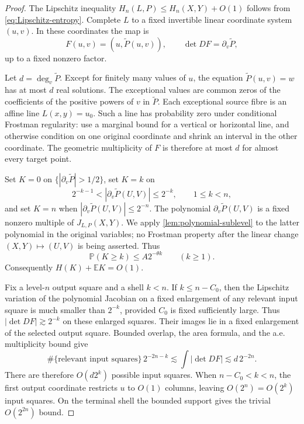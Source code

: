 \documentclass[11pt]{article}
\begin{document}
\begin{proof}
The Lipschitz inequality
\(H_n(L,P)\le H_n(X,Y)+O(1)\) follows from
\eqref{eq:Lipschitz-entropy}.  Complete \(L\) to a fixed invertible
linear coordinate system \((u,v)\).  In these coordinates the map is
\[
 F(u,v)=(u,\widetilde P(u,v)),
 \qquad \det DF=\partial_v\widetilde P,
\]
up to a fixed nonzero factor.

Let \(d=\deg_v\widetilde P\).  Except for finitely many values of
\(u\), the equation \(\widetilde P(u,v)=w\) has at most \(d\) real
solutions.  The exceptional values are common zeros of the
coefficients of the positive powers of \(v\) in \(\widetilde P\).
Each exceptional
source fibre is an affine line \(L(x,y)=u_0\).  Such a line has
probability zero under conditional Frostman regularity: use a
marginal bound for a vertical or horizontal line, and otherwise
condition on one original coordinate and shrink an interval in the
other coordinate.  The geometric
multiplicity of \(F\) is therefore at most \(d\) for almost every
target point.

Set \(K=0\) on \(\{|\partial_v\widetilde P|>1/2\}\), set \(K=k\)
on
\[
 2^{-k-1}<|\partial_v\widetilde P(U,V)|\le2^{-k},
 \qquad 1\le k<n,
\]
and set \(K=n\) when
\(|\partial_v\widetilde P(U,V)|\le2^{-n}\).  The polynomial
\(\partial_v\widetilde P(U,V)\) is a fixed nonzero multiple of
\(J_{L,P}(X,Y)\).  We apply \cref{lem:polynomial-sublevel} to the
latter polynomial in the original variables; no Frostman property
after the linear change \((X,Y)\mapsto(U,V)\) is being asserted.
Thus
\begin{equation}
 \mathbb P(K\ge k)\le A2^{-\theta k}\qquad(k\ge1).
 \label{eq:Jacobian-shell-tail}
\end{equation}
Consequently \(H(K)+\mathbb E K=O(1)\).

Fix a level-\(n\) output square and a shell \(k<n\).  If
\(k\le n-C_0\), then the Lipschitz variation of the polynomial
Jacobian on a fixed enlargement of any relevant input square is much
smaller than \(2^{-k}\), provided \(C_0\) is fixed sufficiently
large.  Thus \(|\det DF|\gtrsim2^{-k}\) on these enlarged squares.
Their images lie in a fixed enlargement of the selected output
square.  Bounded overlap, the area formula, and the a.e. multiplicity
bound give
\[
 \#\{\text{relevant input squares}\}\,2^{-2n-k}
 \lesssim \int|\det DF|
 \lesssim d\,2^{-2n}.
\]
There are therefore \(O(d2^k)\) possible input squares.  When
\(n-C_0<k<n\), the first output coordinate restricts \(u\) to
\(O(1)\) columns, leaving \(O(2^n)=O(2^k)\) input squares.  On the
terminal shell the bounded support gives the trivial \(O(2^{2n})\)
bound.


\end{proof}
\end{document}
